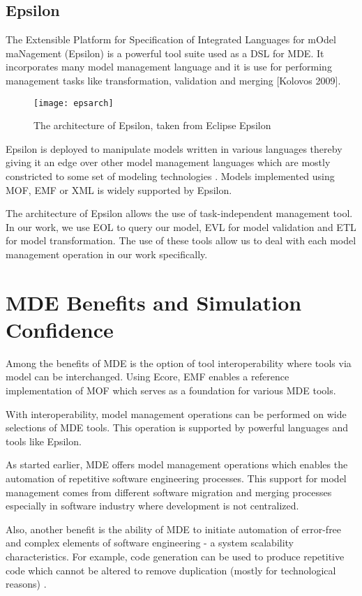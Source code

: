 \documentclass[12pt, a4paper]{report}
\begin{document}
\subsection{Epsilon}
The Extensible Platform for Specification of Integrated Languages for mOdel maNagement (Epsilon) \cite{Kolovos2009} is a powerful tool suite used as a DSL for MDE. It incorporates many model management language and it is use for performing management tasks like transformation, validation and merging [Kolovos 2009].

\begin{figure}[!ht]
  \centering
   \texttt{[image: epsarch]}
  \caption{ The architecture of Epsilon, taken from Eclipse Epsilon}
  \label{fig:mrad}
\end{figure}

Epsilon is deployed to manipulate models written in various languages thereby giving it an edge over other model management languages which are mostly constricted to some set of modeling technologies \cite{kolovos06eol}. Models implemented using MOF, EMF or XML is widely supported by Epsilon. 

The architecture of Epsilon allows the use of task-independent management tool. In our work, we use EOL to query our model, EVL for model validation and ETL for model transformation. The use of these tools allow us to deal with each model management operation in our work specifically.

\section{MDE Benefits and Simulation Confidence}
Among the benefits of MDE is the option of tool interoperability where tools via model can be interchanged. Using Ecore, EMF enables a reference implementation of MOF which serves as a foundation for various MDE tools.

With interoperability, model management operations can be performed on wide selections of MDE tools. This operation is supported by powerful languages and tools like Epsilon.

As started earlier, MDE offers model management operations which enables the automation of repetitive software engineering processes. This support for model management comes from different software migration and merging processes especially in software industry where development is not centralized.

Also, another benefit is the ability of MDE to initiate automation of error-free and complex elements of software engineering - a system scalability characteristics. For example, code generation can be used to produce repetitive code which cannot be altered to remove duplication (mostly for technological reasons) \cite{Rose2011}.
\end{document}
